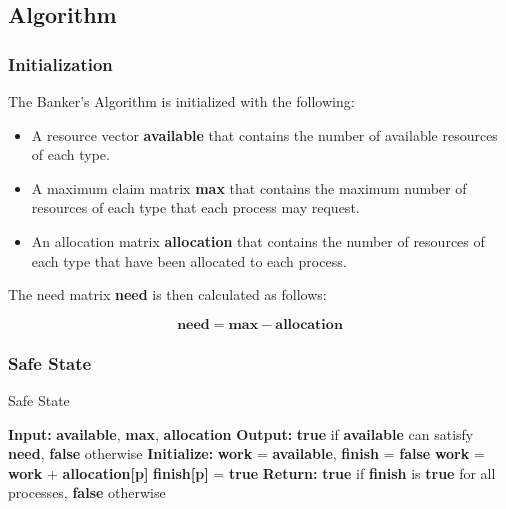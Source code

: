 \subsection{Algorithm}

\subsubsection{Initialization}

The Banker's Algorithm is initialized with the following:

\begin{itemize}
	\item A resource vector \textbf{available} that contains the number of available resources of each type.
	\item A maximum claim matrix \textbf{max} that contains the maximum number of resources of each type that each process may request.
	\item An allocation matrix \textbf{allocation} that contains the number of resources of each type that have been allocated to each process.
\end{itemize}

The need matrix \textbf{need} is then calculated as follows:

\begin{equation}
	\textbf{need} = \textbf{max} - \textbf{allocation}
\end{equation}

\subsubsection{Safe State}

\begin{algorithm}
	\caption{Safe State}
	\label{alg:safe_state}
	\begin{algorithmic}
		\State \textbf{Input:} \textbf{available}, \textbf{max}, \textbf{allocation}
		\State \textbf{Output:} \textbf{true} if \textbf{available} can satisfy \textbf{need}, \textbf{false} otherwise
		\State \textbf{Initialize:} \textbf{work} = \textbf{available}, \textbf{finish} = \textbf{false}
		\State \textbf{work} = \textbf{work} + \textbf{allocation[p]}
		\State \textbf{finish[p]} = \textbf{true}
		\EndIf
		\EndWhile
		\State \textbf{Return:} \textbf{true} if \textbf{finish} is \textbf{true} for all processes, \textbf{false} otherwise
	\end{algorithmic}
\end{algorithm}

